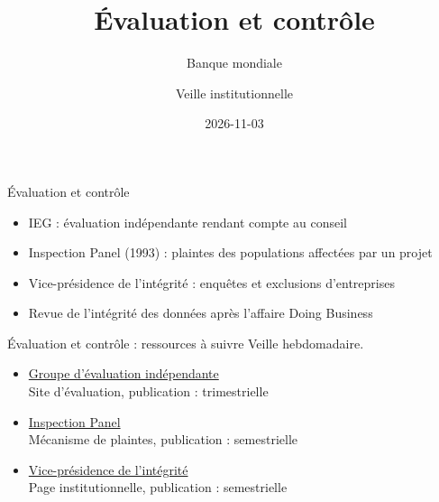 \documentclass[aspectratio=169,11pt]{beamer}
\title{Évaluation et contrôle}
\subtitle{Banque mondiale}
\author{Veille institutionnelle}
\date{2026-11-03}
\begin{document}
\begin{frame}\titlepage\end{frame}

\begin{frame}{Évaluation et contrôle}
\begin{itemize}
\item IEG : évaluation indépendante rendant compte au conseil
\item Inspection Panel (1993) : plaintes des populations affectées par un projet
\item Vice-présidence de l'intégrité : enquêtes et exclusions d'entreprises
\item Revue de l'intégrité des données après l'affaire Doing Business
\end{itemize}
\end{frame}

\begin{frame}{Évaluation et contrôle : ressources à suivre}
\small
Veille hebdomadaire.
\begin{itemize}
\item \href{https://ieg.worldbankgroup.org}{Groupe d'évaluation indépendante}\\{\footnotesize Site d'évaluation, publication : trimestrielle}
\item \href{https://www.inspectionpanel.org}{Inspection Panel}\\{\footnotesize Mécanisme de plaintes, publication : semestrielle}
\item \href{https://www.worldbank.org/en/about/unit/integrity-vice-presidency}{Vice-présidence de l'intégrité}\\{\footnotesize Page institutionnelle, publication : semestrielle}
\end{itemize}
\end{frame}
\end{document}
